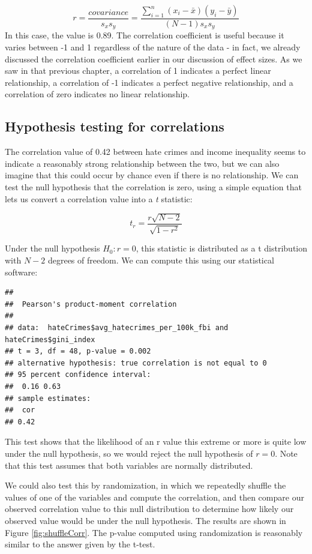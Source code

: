 \documentclass[12pt,]{book}
\theoremstyle{definition}
\theoremstyle{definition}
\theoremstyle{definition}
\theoremstyle{remark}
\begin{document}
\[
r = \frac{covariance}{s_xs_y} = \frac{\sum_{i=1}^n (x_i - \bar{x})(y_i - \bar{y})}{(N - 1)s_x s_y}
\]
In this case, the value is 0.89. The correlation coefficient is useful because it varies between -1 and 1 regardless of the nature of the data - in fact, we already discussed the correlation coefficient earlier in our discussion of effect sizes. As we saw in that previous chapter, a correlation of 1 indicates a perfect linear relationship, a correlation of -1 indicates a perfect negative relationship, and a correlation of zero indicates no linear relationship.

\hypertarget{hypothesis-testing-for-correlations}{%
\subsection{Hypothesis testing for correlations}\label{hypothesis-testing-for-correlations}}

The correlation value of 0.42 between hate crimes and income inequality seems to indicate a reasonably strong relationship between the two, but we can also imagine that this could occur by chance even if there is no relationship. We can test the null hypothesis that the correlation is zero, using a simple equation that lets us convert a correlation value into a \emph{t} statistic:

\[
\textit{t}_r =  \frac{r\sqrt{N-2}}{\sqrt{1-r^2}}
\]

Under the null hypothesis \(H_0:r=0\), this statistic is distributed as a t distribution with \(N - 2\) degrees of freedom. We can compute this using our statistical software:

\begin{verbatim}
## 
##  Pearson's product-moment correlation
## 
## data:  hateCrimes$avg_hatecrimes_per_100k_fbi and hateCrimes$gini_index
## t = 3, df = 48, p-value = 0.002
## alternative hypothesis: true correlation is not equal to 0
## 95 percent confidence interval:
##  0.16 0.63
## sample estimates:
##  cor 
## 0.42
\end{verbatim}

This test shows that the likelihood of an r value this extreme or more is quite low under the null hypothesis, so we would reject the null hypothesis of \(r=0\). Note that this test assumes that both variables are normally distributed.

We could also test this by randomization, in which we repeatedly shuffle the values of one of the variables and compute the correlation, and then compare our observed correlation value to this null distribution to determine how likely our observed value would be under the null hypothesis. The results are shown in Figure \ref{fig:shuffleCorr}. The p-value computed using randomization is reasonably similar to the answer given by the t-test.
\end{document}

